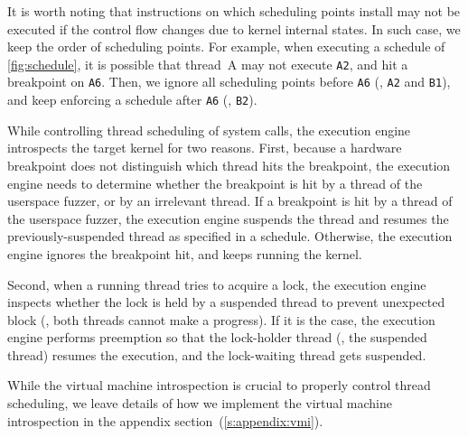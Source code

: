 %
%




%
It is worth noting that instructions on which scheduling points
install may not be executed if the control flow changes due to kernel internal states.
%
\dr{}In such case, we keep the order of scheduling points.
%
For example, when executing a schedule of \autoref{fig:schedule}, it is possible that thread~A may not execute \texttt{A2}, and hit a breakpoint on \texttt{A6}.
%
Then, we ignore all scheduling points before \texttt{A6} (\ie, \texttt{A2} and \texttt{B1}), and keep
enforcing a schedule after \texttt{A6} (\ie, \texttt{B2}).



%
While controlling thread scheduling of system calls, the execution
engine introspects the target kernel for two reasons.
%
First, because a hardware breakpoint does not distinguish which thread
hits the breakpoint, the execution engine needs to determine whether
the breakpoint is hit by a thread of the userspace fuzzer, or by an
irrelevant thread.
%
If a breakpoint is hit by a thread of the userspace fuzzer, the
execution engine suspends the thread and resumes the
previously-suspended thread as specified in a schedule.
%
Otherwise, the execution engine ignores the breakpoint hit, and keeps
running the kernel.


Second, when a running thread tries to acquire a lock, the execution
engine inspects whether the lock is held by a suspended thread to
prevent unexpected block (\ie, both threads cannot make a progress).
%
If it is the case, the execution engine performs preemption so that
the lock-holder thread (\ie, the suspended thread) resumes the
execution, and the lock-waiting thread gets suspended.


While the virtual machine introspection is crucial to properly control
thread scheduling, we leave details of how we implement the virtual
machine introspection in the appendix
section~(\autoref{s:appendix:vmi}).




